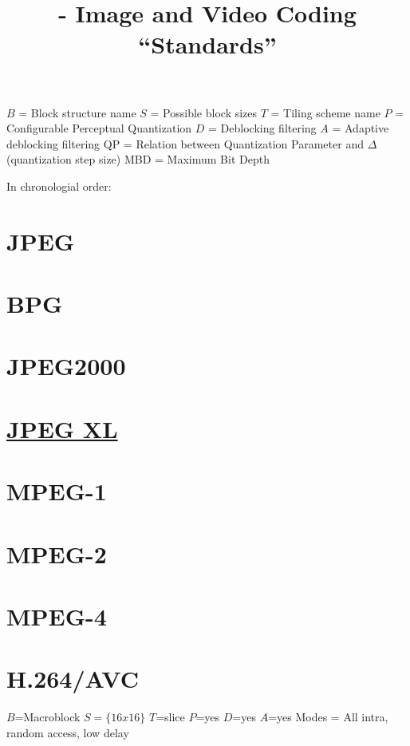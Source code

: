
\title{\SM{} - Image and Video Coding ``Standards''}

\maketitle

\tableofcontents

$B$ = Block structure name
$S$ = Possible block sizes
$T$ = Tiling scheme name
$P$ = Configurable Perceptual Quantization
$D$ = Deblocking filtering
$A$ = Adaptive deblocking filtering
QP = Relation between Quantization Parameter and $\Delta$ (quantization step size)
MBD = Maximum Bit Depth

In chronologial order:

\section{JPEG}

\section{BPG}

\section{JPEG2000}

\section{ \href{https://en.wikipedia.org/wiki/JPEG_XL}{JPEG XL}}

\section{MPEG-1}

\section{MPEG-2}

\section{MPEG-4}

\section{H.264/AVC}

$B$=Macroblock
$S=\{16x16\}$
$T$=slice
$P$=yes
$D$=yes
$A$=yes
Modes = All intra, random access, low delay

